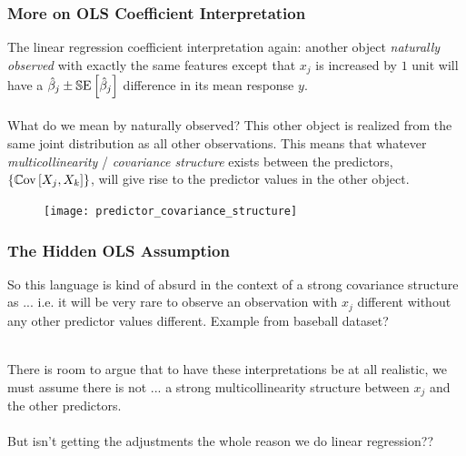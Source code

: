 \documentclass[handout]{beamer}
\begin{document}
\begin{frame}\frametitle{More on OLS Coefficient Interpretation}

\small
The linear regression coefficient interpretation again: another object \emph{naturally observed} with exactly the same features except that $x_j$ is increased by $1$ unit will have a $\hat{\beta}_j \pm \mathbb{S}\text{E}\left[\hat{\beta}_j\right]$ difference in its mean response $y$.\\~\\

What do we mean by naturally observed? \pause This other object is realized from the same joint distribution as all other observations. This means that whatever \textit{multicollinearity} / \textit{covariance structure} exists between the predictors, $\left\{\mathbb{C}\text{ov}\left[X_j, X_k\right]\right\}$, will give rise to the predictor values in the other object.
	
\begin{figure}
\centering
\texttt{[image: predictor\_covariance\_structure]}
\end{figure}

\end{frame}

\begin{frame}\frametitle{The Hidden  OLS Assumption}

So this language  is \pause kind of absurd in the context of a strong covariance structure as ... \pause i.e. it will be very rare to observe an observation with $x_j$ different without any other predictor values different. Example from baseball dataset? \\~\\ \pause 

There is room to argue that to have these interpretations be at all realistic, we must assume there is not ... \pause  a strong multicollinearity structure between $x_j$ and the other predictors. \pause \\~\\

But isn't getting the adjustments the whole reason we do linear regression??
	
\end{frame}
\end{document}
